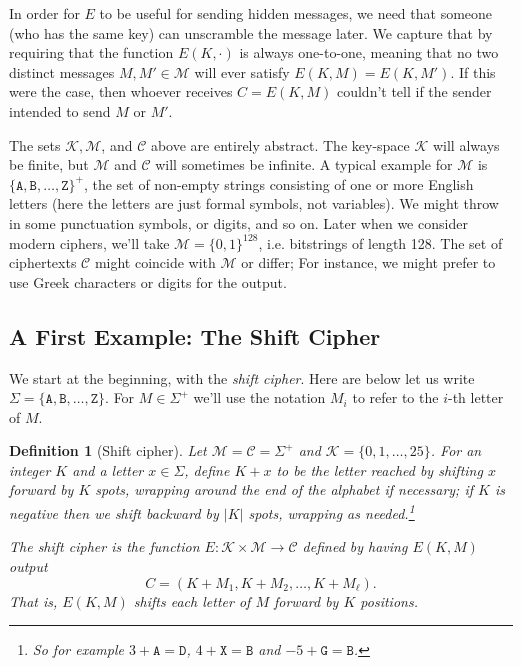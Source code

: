 \documentclass[11pt]{article}
\newtheorem{definition}{Definition}
\newcommand{\msgs}{\mathcal{M}}
\newcommand{\ctxts}{\mathcal{C}}
\newcommand{\keys}{\mathcal{K}}
\newcommand{\enc}{E}
\newcommand{\bits}{\{0,1\}}
\begin{document}
In order for $\enc$ to be useful for sending
hidden messages, we need that someone (who has the same key) can unscramble the
message later. We capture that by requiring that the function $\enc(K,\cdot)$
is always one-to-one, meaning that no two distinct messages $M,M'\in\msgs$ will
ever satisfy $\enc(K,M)=\enc(K,M')$.  If this were the case, then whoever
receives $C=\enc(K,M)$ couldn't tell if the sender intended to send $M$ or
$M'$.

The sets $\keys,\msgs$, and $\ctxts$ above are entirely abstract.  The
key-space $\keys$ will always be finite, but $\msgs$ and $\ctxts$ will
sometimes be infinite. A typical example for $\msgs$ is
$\{\mathtt{A},\mathtt{B},\ldots,\mathtt{Z}\}^+$, the set of non-empty strings
consisting of one or more English letters (here the letters are just formal
symbols, not variables). We might throw in some punctuation symbols, or digits,
and so on. Later when we consider modern ciphers, we'll take $\msgs =
\bits^{128}$, i.e. bitstrings of length 128.  The set of ciphertexts $\ctxts$
might coincide with $\msgs$ or differ; For instance, we might prefer to use
Greek characters or digits for the output.


\subsection{A First Example: The Shift Cipher}

We start at the beginning, with the \emph{shift cipher}. Here are below
let us write $\Sigma = \{\mathtt{A},\mathtt{B},\ldots,\mathtt{Z}\}$.
For $M\in \Sigma^+$
we'll use the notation  $M_i$ to refer to the $i$-th letter
of $M$.
\begin{definition}[Shift cipher]
    Let $\msgs=\ctxts=\Sigma^+$ and
    $\keys=\{0,1,\ldots,25\}$. For an integer $K$ and a letter
    $x\in\Sigma$, define $K+x$ to be the
    letter reached by shifting $x$ forward by $K$ spots, wrapping around the
    end of the alphabet if necessary; if $K$ is negative then we shift
    backward by $|K|$ spots, wrapping as needed.\footnote{So for example
    $3+\mathtt{A}=\mathtt{D}$, $4+\mathtt{X}=\mathtt{B}$
    and $-5 + \mathtt{G}=\mathtt{B}$.}

    The \emph{shift cipher} is the function $\enc:\keys\times\msgs\to\ctxts$
    defined by having $\enc(K,M)$ output 
    \[
        C = (K+M_1,K+M_2,\ldots,K+M_\ell).
    \]
    That is, $\enc(K,M)$ shifts each letter of $M$ forward by $K$ positions.
\end{definition}
\end{document}
